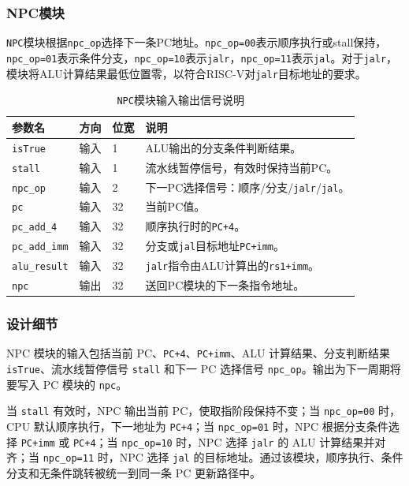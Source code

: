 \documentclass[UTF8,a4paper,12pt]{ctexart}
\newcommand{\code}[1]{\texttt{#1}}
\begin{document}
\subsubsection{NPC模块}

\code{NPC}模块根据\code{npc\_op}选择下一条PC地址。\code{npc\_op=00}表示顺序执行或stall保持，\code{npc\_op=01}表示条件分支，\code{npc\_op=10}表示\code{jalr}，\code{npc\_op=11}表示\code{jal}。对于\code{jalr}，模块将ALU计算结果最低位置零，以符合RISC-V对\code{jalr}目标地址的要求。

\begin{table}[H]
\centering
\caption{\code{NPC}模块输入输出信号说明}
\footnotesize
\renewcommand{\arraystretch}{1.15}
\begin{tabularx}{\textwidth}{p{3.2cm}p{1.5cm}p{2.1cm}X}
\toprule
参数名 & 方向 & 位宽 & 说明 \\
\midrule
\code{isTrue} & 输入 & 1 & ALU输出的分支条件判断结果。 \\
\code{stall} & 输入 & 1 & 流水线暂停信号，有效时保持当前PC。 \\
\code{npc\_op} & 输入 & 2 & 下一PC选择信号：顺序/分支/\code{jalr}/\code{jal}。 \\
\code{pc} & 输入 & 32 & 当前PC值。 \\
\code{pc\_add\_4} & 输入 & 32 & 顺序执行时的\code{PC+4}。 \\
\code{pc\_add\_imm} & 输入 & 32 & 分支或\code{jal}目标地址\code{PC+imm}。 \\
\code{alu\_result} & 输入 & 32& \code{jalr}指令由ALU计算出的\code{rs1+imm}。 \\
\code{npc} & 输出 & 32 & 送回PC模块的下一条指令地址。 \\
\bottomrule
\end{tabularx}
\end{table}

\subsubsection*{设计细节}

NPC 模块的输入包括当前 PC、\code{PC+4}、\code{PC+imm}、ALU 计算结果、分支判断结果 \code{isTrue}、流水线暂停信号 \code{stall} 和下一 PC 选择信号 \code{npc\_op}。输出为下一周期将要写入 PC 模块的 \code{npc}。

当 \code{stall} 有效时，NPC 输出当前 PC，使取指阶段保持不变；当 \code{npc\_op=00} 时，CPU 默认顺序执行，下一地址为 \code{PC+4}；当 \code{npc\_op=01} 时，NPC 根据分支条件选择 \code{PC+imm} 或 \code{PC+4}；当 \code{npc\_op=10} 时，NPC 选择 \code{jalr} 的 ALU 计算结果并对齐；当 \code{npc\_op=11} 时，NPC 选择 \code{jal} 的目标地址。通过该模块，顺序执行、条件分支和无条件跳转被统一到同一条 PC 更新路径中。
\end{document}
